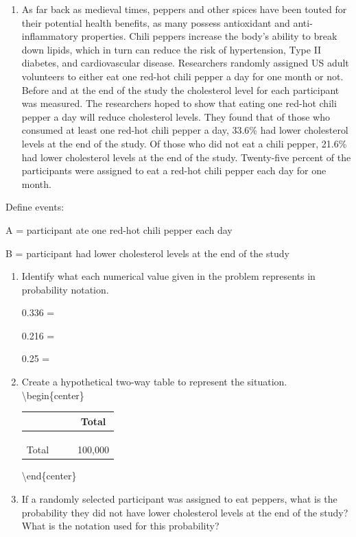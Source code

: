 \documentclass[
]{report}
\providecommand{\tightlist}{%
  \setlength{\itemsep}{0pt}\setlength{\parskip}{0pt}}
\newcommand{\rgi}{\hspace{24pt}}  %
\begin{document}
\begin{enumerate}
\def\labelenumi{\arabic{enumi}.}
\setcounter{enumi}{8}
\tightlist
\item
  As far back as medieval times, peppers and other spices have been touted for their potential health benefits, as many possess antioxidant and anti-inflammatory properties. Chili peppers increase the body's ability to break down lipids, which in turn can reduce the risk of hypertension, Type II diabetes, and cardiovascular disease. Researchers randomly assigned US adult volunteers to either eat one red-hot chili pepper a day for one month or not. Before and at the end of the study the cholesterol level for each participant was measured. The researchers hoped to show that eating one red-hot chili pepper a day will reduce cholesterol levels. They found that of those who consumed at least one red-hot chili pepper a day, 33.6\% had lower cholesterol levels at the end of the study. Of those who did not eat a chili pepper, 21.6\% had lower cholesterol levels at the end of the study. Twenty-five percent of the participants were assigned to eat a red-hot chili pepper each day for one month.
\end{enumerate}

Define events:

\rgi A = participant ate one red-hot chili pepper each day

\rgi B = participant had lower cholesterol levels at the end of the study

\begin{enumerate}
\def\labelenumi{\alph{enumi}.}
\item
  Identify what each numerical value given in the problem represents in probability notation.

  0.336 =

  0.216 =

  0.25 =
\item
  Create a hypothetical two-way table to represent the situation.\\
  \textbackslash begin\{center\}

  \renewcommand{\arraystretch}{1.5}
   \begin{tabular}{cccc} \hline
   \hspace{1in} & \hspace{1in} & \hspace{1in} & Total \\ \hline
   & & & \\ 
   & & & \\ 
   & & & \\ \hline
   Total & & & 100,000 \\ \hline
   \end{tabular}

  \textbackslash end\{center\}
  \vspace{.1in}
\item
  If a randomly selected participant was assigned to eat peppers, what is the probability they did not have lower cholesterol levels at the end of the study? What is the notation used for this probability?
\end{enumerate}
\end{document}
